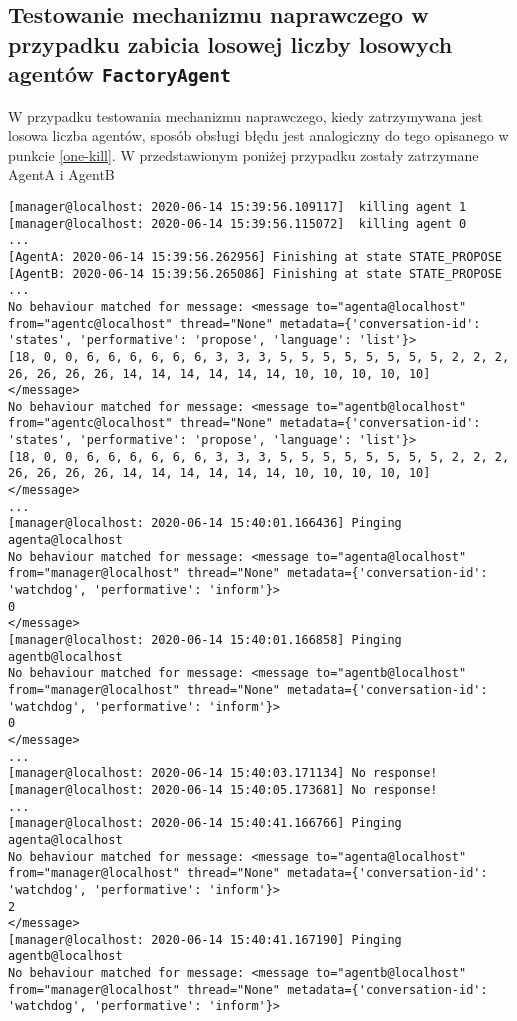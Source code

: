 \subsection{Testowanie mechanizmu naprawczego w przypadku zabicia losowej liczby losowych agentów \texttt{FactoryAgent}}
W przypadku testowania mechanizmu naprawczego, kiedy zatrzymywana jest losowa liczba agentów, sposób obsługi błędu jest analogiczny do tego opisanego w punkcie \ref{one-kill}. W przedstawionym poniżej przypadku zostały zatrzymane AgentA i AgentB
\begin{lstlisting}
[manager@localhost: 2020-06-14 15:39:56.109117]  killing agent 1
[manager@localhost: 2020-06-14 15:39:56.115072]  killing agent 0
...
[AgentA: 2020-06-14 15:39:56.262956] Finishing at state STATE_PROPOSE
[AgentB: 2020-06-14 15:39:56.265086] Finishing at state STATE_PROPOSE
...
No behaviour matched for message: <message to="agenta@localhost" from="agentc@localhost" thread="None" metadata={'conversation-id': 'states', 'performative': 'propose', 'language': 'list'}>
[18, 0, 0, 6, 6, 6, 6, 6, 6, 3, 3, 3, 5, 5, 5, 5, 5, 5, 5, 5, 2, 2, 2, 26, 26, 26, 26, 14, 14, 14, 14, 14, 14, 10, 10, 10, 10, 10]
</message>
No behaviour matched for message: <message to="agentb@localhost" from="agentc@localhost" thread="None" metadata={'conversation-id': 'states', 'performative': 'propose', 'language': 'list'}>
[18, 0, 0, 6, 6, 6, 6, 6, 6, 3, 3, 3, 5, 5, 5, 5, 5, 5, 5, 5, 2, 2, 2, 26, 26, 26, 26, 14, 14, 14, 14, 14, 14, 10, 10, 10, 10, 10]
</message>
...
[manager@localhost: 2020-06-14 15:40:01.166436] Pinging agenta@localhost
No behaviour matched for message: <message to="agenta@localhost" from="manager@localhost" thread="None" metadata={'conversation-id': 'watchdog', 'performative': 'inform'}>
0
</message>
[manager@localhost: 2020-06-14 15:40:01.166858] Pinging agentb@localhost
No behaviour matched for message: <message to="agentb@localhost" from="manager@localhost" thread="None" metadata={'conversation-id': 'watchdog', 'performative': 'inform'}>
0
</message>
...
[manager@localhost: 2020-06-14 15:40:03.171134] No response!
[manager@localhost: 2020-06-14 15:40:05.173681] No response!
...
[manager@localhost: 2020-06-14 15:40:41.166766] Pinging agenta@localhost
No behaviour matched for message: <message to="agenta@localhost" from="manager@localhost" thread="None" metadata={'conversation-id': 'watchdog', 'performative': 'inform'}>
2
</message>
[manager@localhost: 2020-06-14 15:40:41.167190] Pinging agentb@localhost
No behaviour matched for message: <message to="agentb@localhost" from="manager@localhost" thread="None" metadata={'conversation-id': 'watchdog', 'performative': 'inform'}>

\end{lstlisting}
